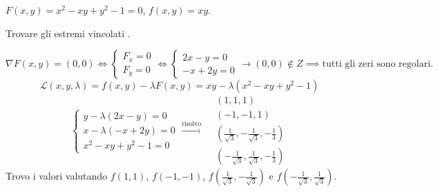 \begin{esercizio}[EXE]
$F(x, y) = x^2 - xy + y^2 - 1 = 0$, \qquad $f(x, y) = xy$.

Trovare gli estremi vincolati .

\[
\nabla F(x, y) = (0, 0) \iff \begin{cases} F_x = 0 \\ F_y = 0 \end{cases} \iff \begin{cases} 2x - y = 0 \\ -x + 2y = 0 \end{cases} \to (0, 0) \notin Z \implies \text{tutti gli zeri sono regolari.}
\]
\[
\mathcal{L}(x, y, \lambda) = f(x, y) - \lambda F(x, y) = xy - \lambda(x^2 - xy + y^2 - 1)
\]
\[
\begin{cases}
y - \lambda(2x - y) = 0 \\
x - \lambda(-x + 2y) = 0 \\
x^2 - xy + y^2 - 1 = 0
\end{cases}
\xrightarrow{\text{risolvo}}
\begin{aligned}
&(1, 1, 1) \\
&(-1, -1, 1) \\
&\left( \frac{1}{\sqrt{3}}, -\frac{1}{\sqrt{3}}, -\frac{1}{3} \right) \\
&\left( -\frac{1}{\sqrt{3}}, \frac{1}{\sqrt{3}}, -\frac{1}{3} \right)
\end{aligned}
\]
Trovo i valori valutando $f(1, 1)$, $f(-1, -1)$, $f\left(\frac{1}{\sqrt{3}}, -\frac{1}{\sqrt{3}}\right)$ e $f\left(-\frac{1}{\sqrt{3}}, \frac{1}{\sqrt{3}}\right)$.
\end{esercizio}
